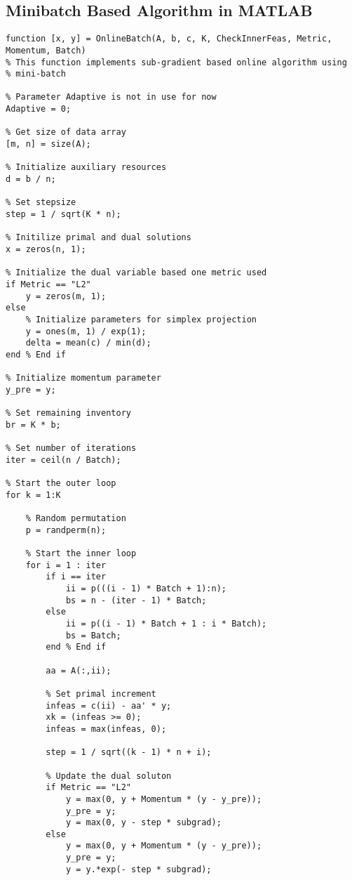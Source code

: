 \documentclass{article}
\begin{document}
\subsection{Minibatch Based Algorithm in MATLAB}


\begin{lstlisting}
function [x, y] = OnlineBatch(A, b, c, K, CheckInnerFeas, Metric, Momentum, Batch)
% This function implements sub-gradient based online algorithm using
% mini-batch

% Parameter Adaptive is not in use for now
Adaptive = 0;

% Get size of data array
[m, n] = size(A);

% Initialize auxiliary resources
d = b / n;

% Set stepsize
step = 1 / sqrt(K * n);

% Initilize primal and dual solutions
x = zeros(n, 1);

% Initialize the dual variable based one metric used
if Metric == "L2"
    y = zeros(m, 1);
else
    % Initialize parameters for simplex projection
    y = ones(m, 1) / exp(1);
    delta = mean(c) / min(d);
end % End if

% Initialize momentum parameter
y_pre = y;

% Set remaining inventory
br = K * b;

% Set number of iterations
iter = ceil(n / Batch);

% Start the outer loop
for k = 1:K
    
    % Random permutation
    p = randperm(n);
    
    % Start the inner loop
    for i = 1 : iter
        if i == iter
            ii = p(((i - 1) * Batch + 1):n);
            bs = n - (iter - 1) * Batch;
        else
            ii = p((i - 1) * Batch + 1 : i * Batch);
            bs = Batch;
        end % End if
        
        aa = A(:,ii);
        
        % Set primal increment
        infeas = c(ii) - aa' * y;
        xk = (infeas >= 0);
        infeas = max(infeas, 0);
        
        step = 1 / sqrt((k - 1) * n + i);
        
        % Update the dual soluton
        if Metric == "L2"
            y = max(0, y + Momentum * (y - y_pre));
            y_pre = y;
            y = max(0, y - step * subgrad);
        else
            y = max(0, y + Momentum * (y - y_pre));
            y_pre = y;
            y = y.*exp(- step * subgrad);
            

\end{lstlisting}
\end{document}
